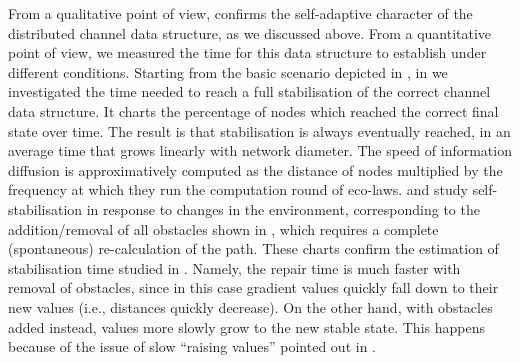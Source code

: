 \documentclass[12pt,a4paper,twoside,openright]{book}
\begin{document}
From a qualitative point of view,  confirms the self-adaptive character of the distributed channel data structure, as we discussed above.
%
From a quantitative point of view, we measured the time for this data structure to establish under different conditions.
%
Starting from the basic scenario depicted in , in  we investigated the time needed to reach a full stabilisation of the correct channel data structure. It charts the percentage of nodes which reached the correct final state over time.
%
The result is that stabilisation is always eventually reached, in an average time that grows linearly with network diameter.
%
The speed of information diffusion is approximatively computed as the distance of nodes multiplied by the frequency at which they run the computation round of eco-laws.
%
 and  study self-stabilisation in response to changes in the environment, corresponding to the addition/removal of all obstacles shown in , which requires a complete (spontaneous) re-calculation of the path.
%
These charts confirm the estimation of stabilisation time studied in \cite{crf}.
%
Namely, the repair time is much faster with removal of obstacles, since in this case gradient values quickly fall down to their new values (i.e., distances quickly decrease).
%
On the other hand, with obstacles added instead, values more slowly grow to the new stable state.
%
This happens because of the issue of slow ``raising values'' pointed out in \cite{crf}.
\end{document}
